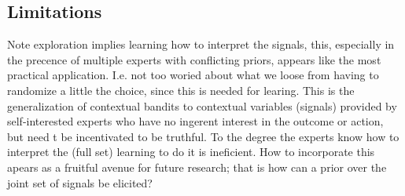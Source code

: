 


\subsection{Limitations}


Note exploration implies learning how to interpret the signals, this, especially in the precence of multiple experts with conflicting priors, appears like the most practical application. I.e. not too woried about what we loose from having to randomize a little the choice, since this is needed for learing. 
This is the generalization of contextual bandits to contextual variables (signals) provided by self-interested experts who have no ingerent interest in the outcome or action, but need t be incentivated to be truthful. 
To the degree the experts know how to interpret the (full set) learning to do it is ineficient. 
How to incorporate this apears as a fruitful avenue for future research; that is how can a prior over the joint set of signals be elicited? 






	




